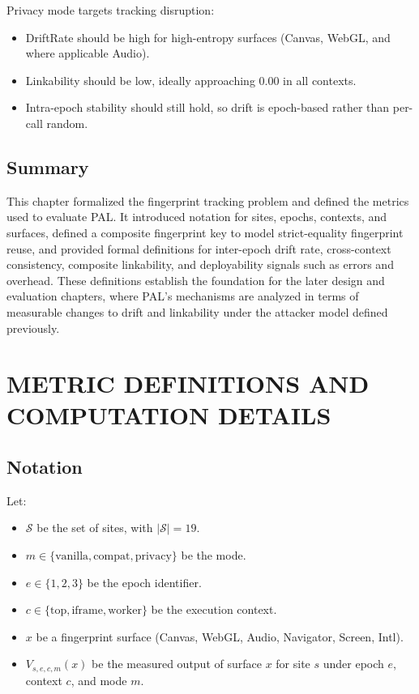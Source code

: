 \documentclass[11pt]{report}
\begin{document}
Privacy mode targets tracking disruption:
\begin{itemize}
    \item DriftRate should be high for high-entropy surfaces (Canvas, WebGL, and where applicable Audio).
    \item Linkability should be low, ideally approaching 0.00 in all contexts.
    \item Intra-epoch stability should still hold, so drift is epoch-based rather than per-call random.
\end{itemize}

\section{Summary}

This chapter formalized the fingerprint tracking problem and defined the metrics used to evaluate PAL. It introduced notation for sites, epochs, contexts, and surfaces, defined a composite fingerprint key to model strict-equality fingerprint reuse, and provided formal definitions for inter-epoch drift rate, cross-context consistency, composite linkability, and deployability signals such as errors and overhead. These definitions establish the foundation for the later design and evaluation chapters, where PAL's mechanisms are analyzed in terms of measurable changes to drift and linkability under the attacker model defined previously.








\chapter{METRIC DEFINITIONS AND COMPUTATION DETAILS}

\section{Notation}

Let:

\begin{itemize}
    \item $\mathcal{S}$ be the set of sites, with $|\mathcal{S}| = 19$.
    \item $m \in \{\text{vanilla},\text{compat},\text{privacy}\}$ be the mode.
    \item $e \in \{1,2,3\}$ be the epoch identifier.
    \item $c \in \{\text{top},\text{iframe},\text{worker}\}$ be the execution context.
    \item $x$ be a fingerprint surface (Canvas, WebGL, Audio, Navigator, Screen, Intl).
    \item $V_{s,e,c,m}(x)$ be the measured output of surface $x$ for site $s$ under epoch $e$, context $c$, and mode $m$.
\end{itemize}
\end{document}
